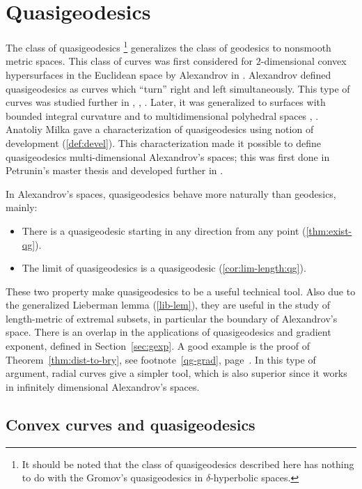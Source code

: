 \chapter{Quasigeodesics %
}\label{chap:qg}



The class of quasigeodesics%
\footnote{It should be noted that the class of quasigeodesics described here 
has nothing to do with the Gromov's quasigeodesics in $\delta$-hyperbolic spaces.} 
generalizes the class of geodesics to nonsmooth metric spaces.
This class of curves was first considered for $2$-dimensional convex hypersurfaces in the Euclidean space
by Alexandrov in \cite{alexandrov:qg}. 
Alexandrov defined quasigeodesics as curves which ``turn'' right and left simultaneously.
This type of curves was studied further in \cite{pogorelov:qg}, \cite{alexandrov-burago},
\cite{milka:qg}.
Later, it was generalized to surfaces with bounded integral
curvature \cite{alexandrov:int-qg} and to multidimensional polyhedral spaces \cite{milka:poly1},
\cite{milka:poly2}.
Anatoliy  Milka gave a characterization of quasigeodesics using notion of development (\ref{def:devel}).
This characterization made it possible to define quasigeodesics multi-dimensional Alexandrov's spaces;
this was first done in Petrunin's master thesis and developed further in \cite{perelman-petrunin:qg}.

In Alexandrov's spaces, quasigeodesics behave more naturally than geodesics, mainly: 
\begin{itemize}
\item There is a quasigeodesic starting in any direction from any point (\ref{thm:exist-qg}).
\item The limit of quasigeodesics is a quasigeodesic (\ref{cor:lim-length:qg}).
\end{itemize}

These two property make quasigeodesics to be a useful technical tool. 
Also due to the generalized Lieberman lemma (\ref{lib-lem}), 
they are useful in the study of length-metric of extremal subsets, 
in particular the boundary of Alexandrov's space. 
There is an overlap in the applications of quasigeodesics and gradient
exponent, defined in Section~\ref{sec:gexp}.
A good example is the proof of
Theorem~\ref{thm:dist-to-bry}, see footnote~\ref{qg-grad},
page~\pageref{qg-grad}.
In this type of argument, radial curves give a simpler tool,
which is also
superior since it works in infinitely dimensional Alexandrov's spaces.

\section{Convex curves and quasigeodesics}

